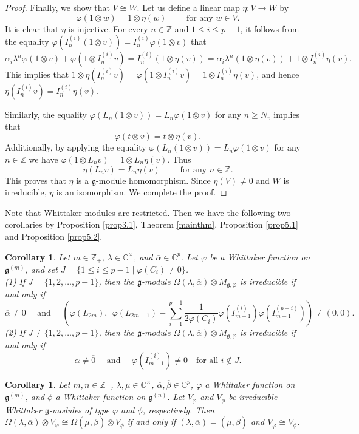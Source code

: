 \documentclass[12pt, reqno]{amsart}
\numberwithin{equation}{section}
\newtheorem{corollary}[theorem]{Corollary}%
\numberwithin{equation}{section}
\def\lmd{\lambda}
\def\al{\alpha}
\def\be{\beta}
\def\g{\mathfrak{g}}
\def\vf{\varphi}
\newcommand{\C}{\mathbb C}
\newcommand{\Z}{\mathbb{Z}}
\newcommand{\ov}[1]{\overline{#1}}
\newcommand{\elei}[2]{I_{#1}^{(#2)}}
\newcommand{\vfi}[2]{\vf\left(I_{#1}^{(#2)}\right)}
\newcommand{\vfl}[1]{\vf(L_{#1})}
\begin{document}
\begin{proof}
Finally, we show that $V\cong W$.
Let us define a linear map $\eta:V\longrightarrow W$ by
 $$\vf(1\otimes w)=1\otimes \eta(w)\qquad\text{ for any }w\in V.$$
 It is clear that $\eta$ is injective.
 For every $n\in\Z$ and $1\leq i\leq p-1$,
it follows from the equality $\vf\left(\elei ni(1\otimes v)\right)=\elei ni\vf(1\otimes v)$ that
 $$\al_i\lmd^n\vf(1\otimes v)+\vf\left(1\otimes \elei ni v\right)=\elei ni(1\otimes\eta(v))
   =\al_i\lmd^n(1\otimes\eta(v))+1\otimes\elei ni\eta(v).$$
This implies that $1\otimes\eta\left(\elei ni v\right)=\vf\left(1\otimes \elei ni v\right)=1\otimes\elei ni\eta(v)$, and hence
 $\eta\left(\elei ni v\right)=\elei ni\eta(v)$.

 Similarly, the equality $\vf(L_n(1\otimes v))=L_n\vf(1\otimes v)$ for any $n\geq N_v$ implies that
 $$\vf(t\otimes v)=t\otimes \eta(v).$$
Additionally, by applying the equality  $\vf(L_n(1\otimes v))=L_n\vf(1\otimes v)$ for any $n\in \Z$  we have
 $\vf(1\otimes L_nv)=1\otimes L_n\eta(v)$. Thus
 $$\eta(L_nv)=L_n\eta(v)\qquad\text{ for any }n\in\Z.$$
 This proves that $\eta$ is a $\g$-module homomorphism.
 Since $\eta(V)\neq 0$ and $W$ is irreducible, $\eta$ is an isomorphism.
 We complete the proof.
\end{proof}



Note that Whittaker modules are restricted.
Then we have the following two corollaries by Proposition \ref{prop3.1}, Theorem \ref{mainthm},
Proposition \ref{prop5.1} and Proposition \ref{prop5.2}.


\begin{corollary}
 Let $m\in\Z_+$, $\lmd\in\C^\times$, and $\ov\al\in\C^p$. Let $ \vf$ be a Whittaker function on $\g^{(m)}$, and set $J=\{1\leq i\leq p-1\mid \vf(C_i)\neq 0\}$. \\
 (1) If $J=\{1,2,\dots,p-1\}$, then the $\g$-module $\Omega(\lmd,\ov\al)\otimes M_{\g,\varphi}$ is irreducible if and only if
 $$\ov\al\neq\ov0\quad\text{ and }\quad
   \left(\vfl {2m},\ \ \vfl{2m-1} - \sum_{i=1}^{p-1}\frac1{2\vf(C_i)}\vfi{m-1}i\vfi{m-1}{p-i}\right)\neq (0,0).$$
 (2) If $J\neq\{1,2,\dots,p-1\}$, then the $\g$-module $\Omega(\lmd,\ov\al)\otimes M_{\g,\varphi}$ is irreducible if and only if
 $$\ov\al\neq\ov0\quad\text{ and }\quad\vfi {m-1}i\neq 0\quad\text{for all }i\notin J.$$
\end{corollary}
\begin{corollary}
 Let $m,n\in\Z_+$, $\lmd,\mu\in\C^\times$, $\ov\al,\ov\be\in\C^p$, $\vf$ a Whittaker function on $\g^{(m)}$, and $\phi$ a Whittaker function on $\g^{(n)}$. Let $V_\varphi$ and $V_\phi$ be irreducible Whittaker $\g$-modules of type $\varphi$ and $\phi$, respectively.
 Then $\Omega(\lmd,\ov\al)\otimes V_\varphi\cong\Omega(\mu,\ov\be)\otimes V_\phi$ if and only if
 $(\lmd,\ov\al)=(\mu,\ov\be)$ and $V_\varphi\cong V_\phi$.
\end{corollary}
\end{document}
